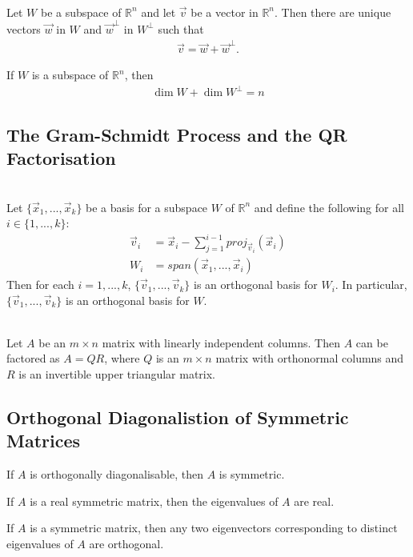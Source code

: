 \documentclass{article}
\begin{document}
\begin{theorem}
    \\
    Let $W$ be a subspace of $\mathbb{R}^n$ and let $\vec v$ be a vector in $\mathbb{R}^n$.
    Then there are unique vectors $\vec w$ in $W$ and $\vec w^{\perp}$ in $W^{\perp}$ such that
\begin{align*}
    \vec v = \vec w + \vec w^{\perp}.
\end{align*}
\end{theorem}
\setcounter{theorem}{12}
\begin{theorem}
    If $W$ is a subspace of $\mathbb{R}^n$, then
    \begin{align*}
        \dim W + \dim W^{\perp} = n        
    \end{align*}
\end{theorem}
\setcounter{theorem}{14}
\subsection{The Gram-Schmidt Process and the QR Factorisation}
\begin{theorem}
    \\
    Let $\{\vec x_1, ..., \vec x_k\}$ be a basis for a subspace $W$ of $\mathbb{R}^n$ and define the following for all $i\in\{1,...,k\}$:
    \begin{align*}
        \vec v_i &= \vec x_i - \sum^{i-1}_{j=1} proj_{\vec v_i}(\vec x_i)\\
        W_i &= span(\vec x_1, ..., \vec x_i)
    \end{align*}
    Then for each $i=1, ..., k$, $\{\vec v_1, ..., \vec v_k\}$ is an orthogonal basis for $W_i$. In particular, $\{\vec v_1, ..., \vec v_k\}$ is an orthogonal basis for $W$.
\end{theorem}
\begin{theorem}
    \\
    Let $A$ be an $m\times n$ matrix with linearly independent columns. Then $A$ can be factored as $A=QR$, where $Q$ is an $m\times n$ matrix with orthonormal columns and $R$ is an invertible upper triangular matrix.
\end{theorem}
\subsection{Orthogonal Diagonalistion of Symmetric Matrices}
\begin{theorem}
    If $A$ is orthogonally diagonalisable, then $A$ is symmetric.
\end{theorem}
\begin{theorem}
    If $A$ is a real symmetric matrix, then the eigenvalues of $A$ are real.
\end{theorem}
\begin{theorem}
    If $A$ is a symmetric matrix, then any two eigenvectors corresponding to distinct eigenvalues of $A$ are orthogonal.
\end{theorem}
\end{document}
